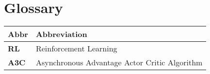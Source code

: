 %
%

\chapter*{Glossary}\label{chap.glossar}
\label{cha:abkürzungsverzeichnis}


\begin{longtable}{|m{3cm}|m{11cm}|}\hline	
	\rowcolor{gray} \textbf{Abbr}&
	Abbreviation \\ \hline

	\textbf{RL}&
	Reinforcement Learning \\ \hline

	\textbf{A3C}&
	 Asynchronous Advantage Actor Critic Algorithm \\ \hline
	
	
	
\end{longtable}

